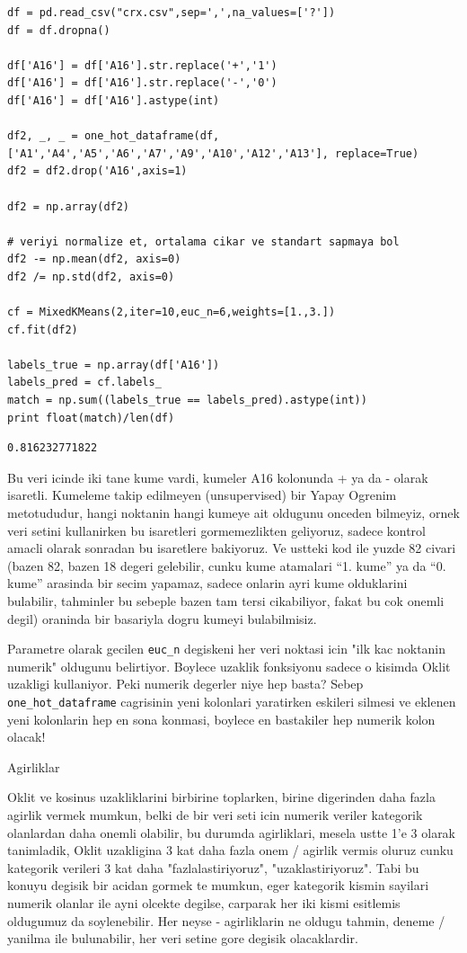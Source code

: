 \documentclass[12pt,fleqn]{article}\usepackage{../common}
\begin{document}
\begin{verbatim}
df = pd.read_csv("crx.csv",sep=',',na_values=['?'])
df = df.dropna()

df['A16'] = df['A16'].str.replace('+','1')
df['A16'] = df['A16'].str.replace('-','0')
df['A16'] = df['A16'].astype(int)

df2, _, _ = one_hot_dataframe(df, ['A1','A4','A5','A6','A7','A9','A10','A12','A13'], replace=True)
df2 = df2.drop('A16',axis=1)

df2 = np.array(df2)

# veriyi normalize et, ortalama cikar ve standart sapmaya bol
df2 -= np.mean(df2, axis=0)
df2 /= np.std(df2, axis=0)

cf = MixedKMeans(2,iter=10,euc_n=6,weights=[1.,3.])
cf.fit(df2)

labels_true = np.array(df['A16'])
labels_pred = cf.labels_
match = np.sum((labels_true == labels_pred).astype(int))
print float(match)/len(df)
\end{verbatim}

\begin{verbatim}
0.816232771822
\end{verbatim}

Bu veri icinde iki tane kume vardi, kumeler A16 kolonunda + ya da - olarak
isaretli. Kumeleme takip edilmeyen (unsupervised) bir Yapay Ogrenim
metotududur, hangi noktanin hangi kumeye ait oldugunu onceden bilmeyiz,
ornek veri setini kullanirken bu isaretleri gormemezlikten geliyoruz,
sadece kontrol amacli olarak sonradan bu isaretlere bakiyoruz. Ve ustteki
kod ile yuzde 82 civari (bazen 82, bazen 18 degeri gelebilir, cunku kume
atamalari ``1. kume'' ya da ``0. kume'' arasinda bir secim yapamaz, sadece
onlarin ayri kume olduklarini bulabilir, tahminler bu sebeple bazen tam
tersi cikabiliyor, fakat bu cok onemli degil) oraninda bir basariyla dogru
kumeyi bulabilmisiz.

Parametre olarak gecilen \verb!euc_n! degiskeni her veri noktasi icin "ilk kac
noktanin numerik" oldugunu belirtiyor. Boylece uzaklik fonksiyonu sadece
o kisimda Oklit uzakligi kullaniyor. Peki numerik degerler niye hep basta?
Sebep \verb!one_hot_dataframe! cagrisinin yeni kolonlari yaratirken eskileri
silmesi ve eklenen yeni kolonlarin hep en sona konmasi, boylece en bastakiler
hep numerik kolon olacak!

Agirliklar

Oklit ve kosinus uzakliklarini birbirine toplarken, birine digerinden
daha fazla agirlik vermek mumkun, belki de bir veri seti icin numerik
veriler kategorik olanlardan daha onemli olabilir, bu durumda
agirliklari, mesela ustte 1'e 3 olarak tanimladik, Oklit uzakligina 3
kat daha fazla onem / agirlik vermis oluruz cunku kategorik verileri 3
kat daha "fazlalastiriyoruz", "uzaklastiriyoruz". Tabi bu konuyu
degisik bir acidan gormek te mumkun, eger kategorik kismin sayilari
numerik olanlar ile ayni olcekte degilse, carparak her iki kismi
esitlemis oldugumuz da soylenebilir. Her neyse - agirliklarin ne
oldugu tahmin, deneme / yanilma ile bulunabilir, her veri setine gore
degisik olacaklardir.
\end{document}
